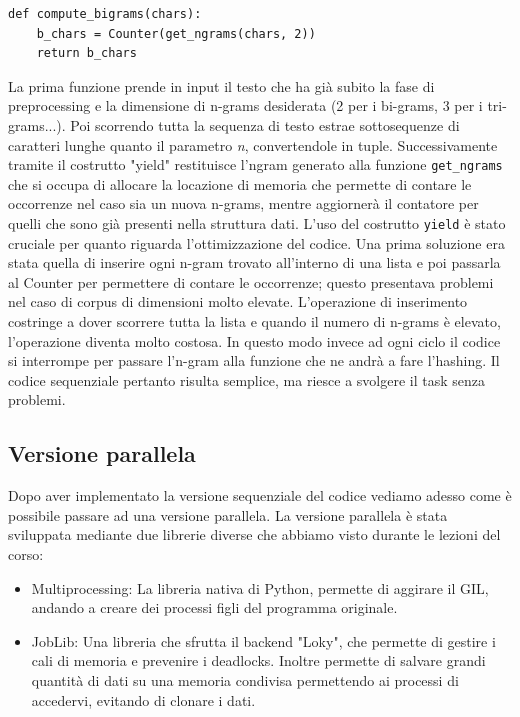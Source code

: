 \documentclass[10pt,twocolumn,letterpaper]{article}
\begin{document}
\begin{lstlisting}[caption={Conteggio dei bi-grams}]
def compute_bigrams(chars):
    b_chars = Counter(get_ngrams(chars, 2))
    return b_chars
\end{lstlisting}

La prima funzione prende in input il testo che ha già subito la fase di preprocessing e la dimensione di n-grams desiderata (2 per i bi-grams, 3 per i tri-grams...). Poi scorrendo tutta la sequenza di testo estrae sottosequenze di caratteri lunghe quanto il parametro \textit{n}, convertendole in tuple. Successivamente tramite il costrutto "yield" restituisce l'ngram generato alla funzione \lstinline{get_ngrams} che si occupa di allocare la locazione di memoria che permette di contare le occorrenze nel caso sia un nuova n-grams, mentre aggiornerà il contatore per quelli che sono già presenti nella struttura dati.
L'uso del costrutto \lstinline{yield} è stato cruciale per quanto riguarda l'ottimizzazione del codice. Una prima soluzione era stata quella di inserire ogni n-gram trovato all'interno di una lista e poi passarla al Counter per permettere di contare le occorrenze; questo presentava problemi nel caso di corpus di dimensioni molto elevate. L'operazione di inserimento costringe a dover scorrere tutta la lista e quando il numero di n-grams è elevato, l'operazione diventa molto costosa. In questo modo invece ad ogni ciclo il codice si interrompe per passare l'n-gram alla funzione che ne andrà a fare l'hashing. Il codice sequenziale pertanto risulta semplice, ma riesce a svolgere il task senza problemi.

\subsection{Versione parallela}
Dopo aver implementato la versione sequenziale del codice vediamo adesso come è possibile passare ad una versione parallela. La versione parallela è stata sviluppata mediante due librerie diverse che abbiamo visto durante le lezioni del corso:
\begin{itemize}
   \item Multiprocessing: La libreria nativa di Python, permette di aggirare il GIL, andando a creare dei processi figli del programma originale.
   \item JobLib: Una libreria che sfrutta il backend "Loky", che permette di gestire i cali di memoria e prevenire i deadlocks. Inoltre permette di salvare grandi quantità di dati su una memoria condivisa permettendo ai processi di accedervi, evitando di clonare i dati.
\end{itemize}
\end{document}
